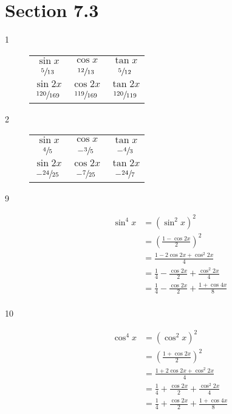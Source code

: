 \documentclass{exam}
\begin{document}
    \section{Section 7.3}
    \begin{description}

      \item[1] 
        \begin{tabular}[H]{ccc}
          \toprule
          $\sin x$           & $\cos x$           & $\tan x$      \\
          $\sfrac{5}{13}$    & $\sfrac{12}{13}$   & $\sfrac{5}{12}$ \\
          \midrule
          $\sin 2x$          & $\cos 2x$          & $\tan 2x$      \\
          $\sfrac{120}{169}$ & $\sfrac{119}{169}$ & $\sfrac{120}{119}$ \\
          \bottomrule
        \end{tabular}

      \item[2] 
        \begin{tabular}[H]{ccc}
          \toprule
          $\sin x$          & $\cos x$         & $\tan x$      \\
          $\sfrac{4}{5}$    & $- \sfrac{3}{5}$ & $-\sfrac{4}{3}$ \\
          \midrule
          $\sin 2x$         & $\cos 2x$        & $\tan 2x$      \\
          $-\sfrac{24}{25}$ & $-\sfrac{7}{25}$ & $-\sfrac{24}{7}$ \\
          \bottomrule
        \end{tabular}

      \item[9]
        \begin{align*}
          \sin^4 x & = \left( \sin^2 x \right)^2 \\
                   & = \left( \frac{1 - \cos 2x}{2} \right)^2 \\
                   & = \frac{1 - 2 \cos 2x + \cos^2 2x}{4} \\
                   &= \frac{1}{4} - \frac{\cos 2x}{2} + \frac{\cos^2 2x}{4} \\
                   &= \boxed{ \frac{1}{4} - \frac{\cos 2x}{2} + \frac{1 + \cos 4x}{8} } \\
        \end{align*}

      \item[10]
        \begin{align*}
          \cos^4 x & = \left( \cos^2 x \right)^2 \\
                   & = \left( \frac{1 + \cos 2x}{2} \right)^2 \\
                   & = \frac{1 + 2 \cos 2x + \cos^2 2x}{4} \\
                   &= \frac{1}{4} + \frac{\cos 2x}{2} + \frac{\cos^2 2x}{4} \\
                   &= \boxed{ \frac{1}{4} + \frac{\cos 2x}{2} + \frac{1 + \cos 4x}{8} } \\
        \end{align*}


\end{description}
\end{document}
